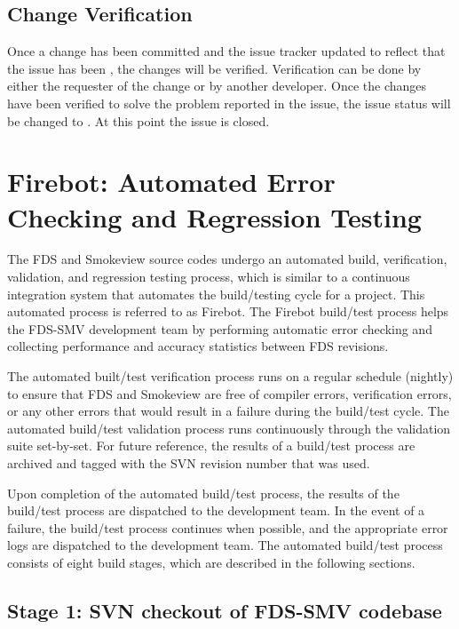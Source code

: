 \documentclass[11pt]{book}
\begin{document}
\subsection{Change Verification}

Once a change has been committed and the issue tracker updated to reflect that the issue has been , the changes will be verified.  Verification can be done by either the requester of the change or by another developer.  Once the changes have been verified to solve the problem reported in the issue, the issue status will be changed to .  At this point the issue is closed.


\section{Firebot: Automated Error Checking and Regression Testing}

The FDS and Smokeview source codes undergo an automated build, verification, validation, and regression testing process, which is similar to a continuous integration system that automates the build/testing cycle for a project. This automated process is referred to as Firebot. The Firebot build/test process helps the FDS-SMV development team by performing automatic error checking and collecting performance and accuracy statistics between FDS revisions.

The automated built/test verification process runs on a regular schedule (nightly) to ensure that FDS and Smokeview are free of compiler errors, verification errors, or any other errors that would result in a failure during the build/test cycle. The automated build/test validation process runs continuously through the validation suite set-by-set. For future reference, the results of a build/test process are archived and tagged with the SVN revision number that was used.

Upon completion of the automated build/test process, the results of the build/test process are dispatched to the development team. In the event of a failure, the build/test process continues when possible, and the appropriate error logs are dispatched to the development team. The automated build/test process consists of eight build stages, which are described in the following sections.

\subsection*{Stage 1: SVN checkout of FDS-SMV codebase}
\end{document}
